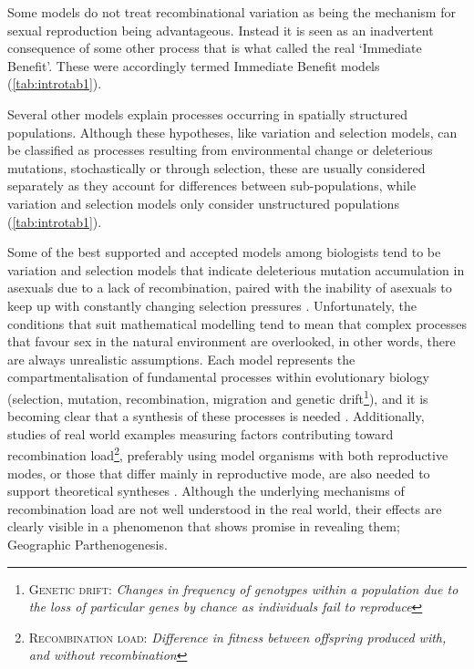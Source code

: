 Some models do not treat recombinational variation as being the mechanism for sexual reproduction being advantageous. Instead it is seen as an inadvertent consequence of some other process that is what \textcite{kondrashov_classification_1993} called the real `Immediate Benefit'. These were accordingly termed Immediate Benefit models (\cref{tab:introtab1}).

Several other models explain processes occurring in spatially structured populations. Although these hypotheses, like variation and selection models, can be classified as processes resulting from environmental change or deleterious mutations, stochastically or through selection, these are usually considered separately \parencite{maynard-smith_evolution_1978,kondrashov_classification_1993} as they account for differences between sub-populations, while variation and selection models only consider unstructured populations (\cref{tab:introtab1}).

Some of the best supported and accepted models among biologists tend to be variation and selection models that indicate deleterious mutation accumulation in asexuals due to a lack of recombination, paired with the inability of asexuals to keep up with constantly changing selection pressures \parencite[for example the Red Queen hypothesis;][]{van_valen_new_1973}. Unfortunately, the conditions that suit mathematical modelling tend to mean that complex processes that favour sex in the natural environment are overlooked, in other words, there are always unrealistic assumptions. Each model represents the compartmentalisation of fundamental processes within evolutionary biology (selection, mutation, recombination, migration and genetic drift\footnote[2]{\textsc{Genetic drift:} \textit{Changes in frequency of genotypes within a population due to the loss of particular genes by chance as individuals fail to reproduce}}), and it is becoming clear that a synthesis of these processes is needed \parencite{west_pluralist_1999,otto_resolving_2002}. Additionally, studies of real world examples measuring factors contributing toward recombination load\footnote[3]{\textsc{Recombination load:} \textit{Difference in fitness between offspring produced with, and without recombination}}, preferably using model organisms with both reproductive modes, or those that differ mainly in reproductive mode, are also needed to support theoretical syntheses \parencite{otto_resolving_2002}. Although the underlying mechanisms of recombination load are not well understood in the real world, their effects are clearly visible in a phenomenon that shows promise in revealing them; Geographic Parthenogenesis.


